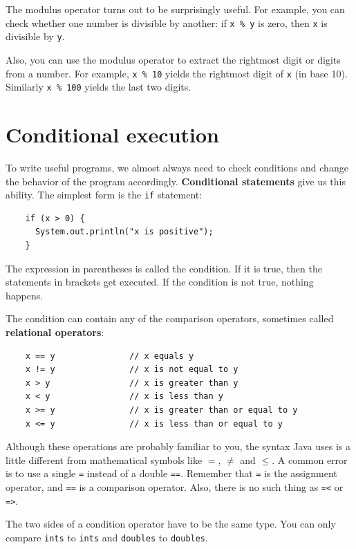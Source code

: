 \documentclass[12pt]{book}
\theoremstyle{exercise}
\begin{document}
The modulus operator turns out to be surprisingly useful.  For
example, you can check whether one number is divisible by
another: if {\tt x \% y} is zero, then {\tt x} is divisible
by {\tt y}.

Also, you can use the modulus operator to extract the rightmost
digit or digits from a number.  For example, {\tt x \% 10} yields
the rightmost digit of {\tt x} (in base 10).  Similarly
{\tt x \% 100} yields the last two digits.


\section{Conditional execution}

To write useful programs, we almost always need
to check conditions and change the behavior of the program
accordingly.  {\bf Conditional statements} give us this ability.  The
simplest form is the {\tt if} statement:

\begin{lstlisting}
    if (x > 0) {
      System.out.println("x is positive");
    }
\end{lstlisting}
%
The expression in parentheses is called the condition.
If it is true, then the statements in brackets get executed.
If the condition is not true, nothing happens.


The condition can contain any of the comparison operators,
sometimes called {\bf relational operators}:

\begin{lstlisting}
    x == y               // x equals y
    x != y               // x is not equal to y
    x > y                // x is greater than y
    x < y                // x is less than y
    x >= y               // x is greater than or equal to y
    x <= y               // x is less than or equal to y
\end{lstlisting}
%
Although these operations are probably familiar to you, the
syntax Java uses is a little different from mathematical
symbols like $=$, $\neq$ and $\le$.  A common error is
to use a single {\tt =} instead of a double {\tt ==}.  Remember
that {\tt =} is the assignment operator, and {\tt ==} is
a comparison operator.  Also, there is no such thing as
{\tt =<} or {\tt =>}.

The two sides of a condition operator have to be the same
type.  You can only compare {\tt ints} to {\tt ints} and
{\tt doubles} to {\tt doubles}.
\end{document}
